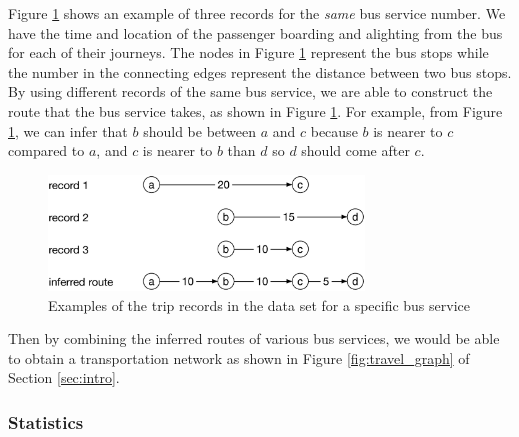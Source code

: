 \documentclass[draft]{sig-alternate}
\begin{document}
Figure \ref{fig:trip_example} shows an example of three records for the \emph{same} bus service number. We have the time and location of the passenger boarding and alighting from the bus for each of their journeys. The nodes in Figure \ref{fig:trip_example} represent the bus stops while the number in the connecting edges represent the distance between two bus stops. By using different records of the same bus service, we are able to construct the route that the bus service takes, as shown in Figure \ref{fig:trip_example}. For example, from Figure \ref{fig:trip_example}, we can infer that $b$ should be between $a$ and $c$ because $b$ is nearer to $c$ compared to $a$, and $c$ is nearer to $b$ than $d$ so $d$ should come after $c$.
\begin{figure}[htb]
	\centering
	\includegraphics[width=3.3in]{trip_example}
	\caption{Examples of the trip records in the data set for a specific bus service}
	\label{fig:trip_example}
\end{figure}
Then by combining the inferred routes of various bus services, we would be able to obtain a transportation network as shown in Figure \ref{fig:travel_graph} of Section \ref{sec:intro}. %

\subsubsection{Statistics}
\end{document}
